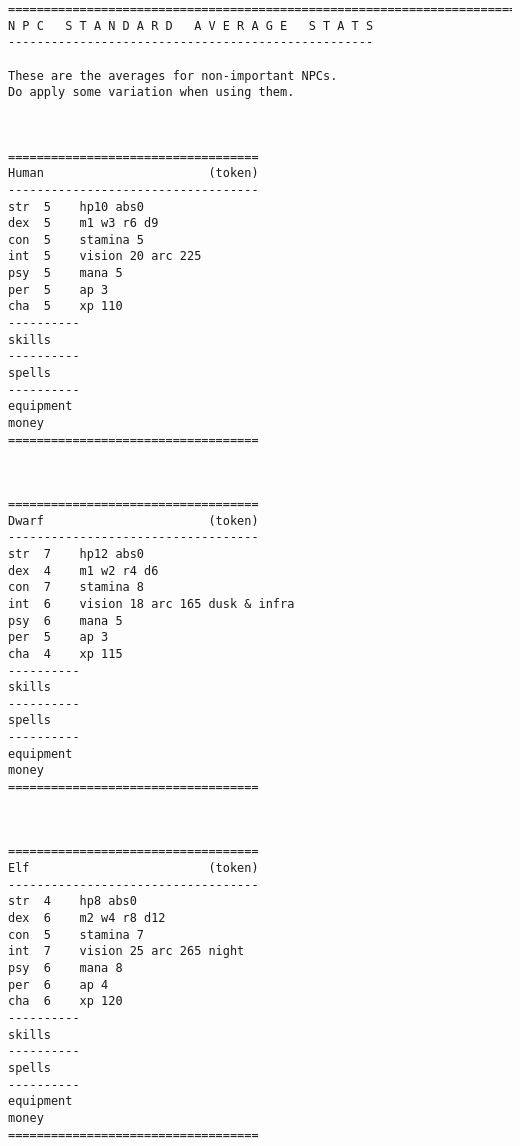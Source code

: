 
 {}
\goodbreak \tiny \begin{samepage} \begin{verbatim}
================================================================================
N P C   S T A N D A R D   A V E R A G E   S T A T S
---------------------------------------------------

These are the averages for non-important NPCs.
Do apply some variation when using them.
\end{verbatim} \end{samepage} \normalsize

\

\goodbreak \tiny \begin{samepage} \begin{verbatim}
===================================
Human                       (token)
-----------------------------------
str  5    hp10 abs0
dex  5    m1 w3 r6 d9
con  5    stamina 5
int  5    vision 20 arc 225
psy  5    mana 5
per  5    ap 3
cha  5    xp 110
----------
skills
----------
spells
----------
equipment
money
===================================
\end{verbatim} \end{samepage} \normalsize

\

\goodbreak \tiny \begin{samepage} \begin{verbatim}
===================================
Dwarf                       (token)
-----------------------------------
str  7    hp12 abs0
dex  4    m1 w2 r4 d6
con  7    stamina 8
int  6    vision 18 arc 165 dusk & infra
psy  6    mana 5
per  5    ap 3
cha  4    xp 115
----------
skills
----------
spells
----------
equipment
money
===================================
\end{verbatim} \end{samepage} \normalsize

\

\goodbreak \tiny \begin{samepage} \begin{verbatim}
===================================
Elf                         (token)
-----------------------------------
str  4    hp8 abs0
dex  6    m2 w4 r8 d12
con  5    stamina 7
int  7    vision 25 arc 265 night
psy  6    mana 8
per  6    ap 4
cha  6    xp 120
----------
skills
----------
spells
----------
equipment
money
===================================
\end{verbatim} \end{samepage} \normalsize

